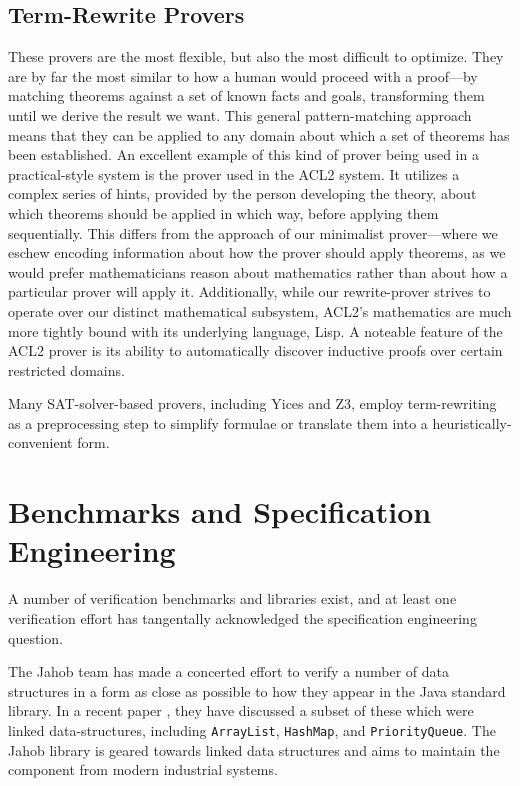 \subsection{Term-Rewrite Provers}  These provers are the most flexible, but also the most difficult to optimize.  They are by far the most similar to how a human would proceed with a proof---by matching theorems against a set of known facts and goals, transforming them until we derive the result we want.  This general pattern-matching approach means that they can be applied to any domain about which a set of theorems has been established.  An excellent example of this kind of prover being used in a practical-style system is the prover used in the ACL2 system.  It utilizes a complex series of hints, provided by the person developing the theory, about which theorems should be applied in which way, before applying them sequentially.  This differs from the approach of our minimalist prover---where we eschew encoding information about how the prover should apply theorems, as we would prefer mathematicians reason about mathematics rather than about how a particular prover will apply it.  Additionally, while our rewrite-prover strives to operate over our distinct mathematical subsystem, ACL2's mathematics are much more tightly bound with its underlying language, Lisp.  A noteable feature of the ACL2 prover is its ability to automatically discover inductive proofs over certain restricted domains.

Many SAT-solver-based provers, including Yices and Z3, employ term-rewriting as a preprocessing step to simplify formulae or translate them into a heuristically-convenient form.

\section{Benchmarks and Specification Engineering}\label{sec:overviewEngineering}
A number of verification benchmarks and libraries exist, and at least one verification effort has tangentally acknowledged the specification engineering question.

The Jahob team has made a concerted effort to verify a number of data structures in a form as close as possible to how they appear in the Java standard library.  In a recent paper \cite{zee:annotations}, they have discussed a subset of these which were linked data-structures, including \texttt{ArrayList}, \texttt{HashMap}, and \texttt{PriorityQueue}.  The Jahob library is geared towards linked data structures and aims to maintain the component from modern industrial systems.  

